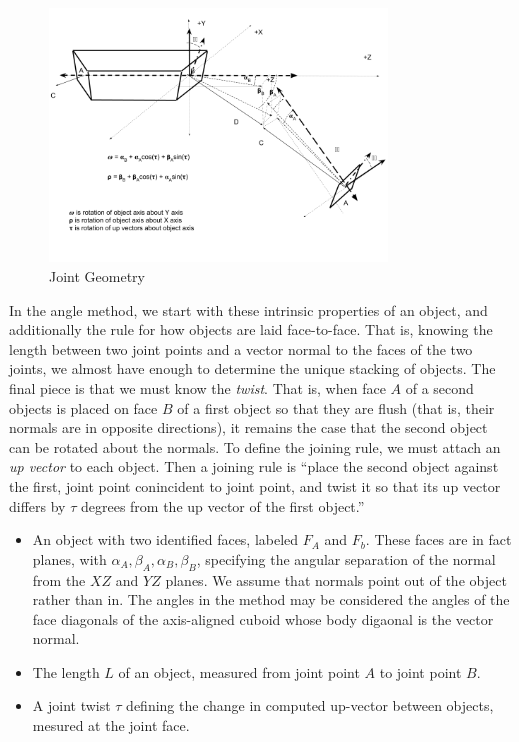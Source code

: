 \documentclass[11pt]{article}
\begin{document}
{\begin{figure}
     \centering
     \includegraphics[width=0.80\textwidth]{figures/JointGeometry.png}
     \caption{Joint Geometry}
  \label{fig:jointdiagram}
\end{figure}




In the angle method, we start with these intrinsic properties of an object, and additionally the
rule for how objects are laid face-to-face. That is, knowing the length between two
joint points and a vector normal to the faces of the two joints, we almost have
enough to determine the unique stacking of objects. The final piece is that we must
know the {\em twist}. That is, when face $A$ of a second objects is placed on face $B$
of a first object so that they are flush (that is, their normals are in opposite directions),
it remains the case that the second object can be rotated about the normals. To
define the joining rule, we must attach an {\em up vector} to each object. Then a joining
rule is ``place the second object against the first, joint point conincident to joint point,
and twist it so that its up vector differs by $\tau$ degrees from the up vector of the first
object.''

\begin{itemize}
\item An object with two identified faces, labeled $F_A$ and $F_b$. These faces are in
  fact planes, with $\alpha_A, \beta_A, \alpha_B, \beta_B$, specifying the
  angular separation of the normal from the $XZ$ and $YZ$ planes. We assume that normals point out
  of the object rather than in. The angles in the method may be considered the angles of the face diagonals of the axis-aligned cuboid whose body digaonal is the vector normal.
\item The length $L$ of an object, measured from joint point $A$ to joint point $B$.
\item A joint twist $\tau$ defining the change in computed up-vector between objects,
  mesured at the joint face.
\end{itemize}


}
\end{document}
